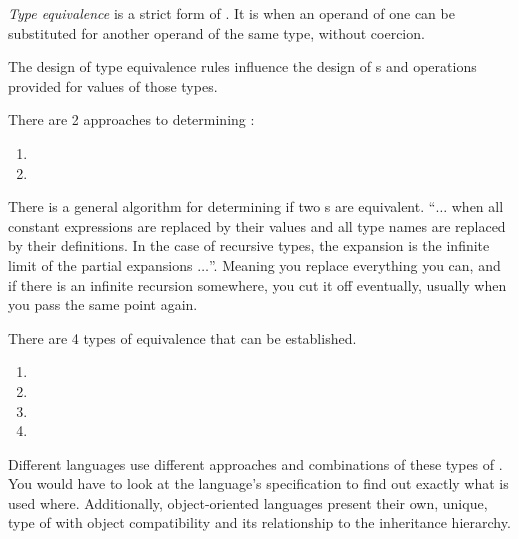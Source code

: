 \begin{definition}\label{def:Type_Equivalence}
  \emph{Type equivalence} is a strict form of .
  It is when an operand of one  can be substituted for another operand of the same type, without  coercion.

  The design of type equivalence rules influence the design of s and operations provided for values of those types.

  There are 2 approaches to determining :
  \begin{enumerate}[noitemsep]
  \item {}
  \item {}
  \end{enumerate}

  There is a general algorithm for determining if two s are equivalent.
  ``$\ldots$ when all constant expressions are replaced by their values and all type names are replaced by their definitions.
  In the case of recursive types, the expansion is the infinite limit of the partial expansions $\ldots$''.
  Meaning you replace everything you can, and if there is an infinite recursion somewhere, you cut it off eventually, usually when you pass the same point again.

  There are 4 types of equivalence that can be established.
  \begin{enumerate}[noitemsep]
  \item {}
  \item {}
  \item {}
  \item {}
  \end{enumerate}
\end{definition}

Different languages use different approaches and combinations of these types of .
You would have to look at the language's specification to find out exactly what is used where.
Additionally, object-oriented languages present their own, unique, type of  with object compatibility and its relationship to the inheritance hierarchy.

